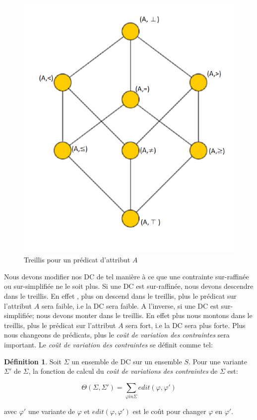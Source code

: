 \documentclass[letterpaper, 12pt]{report}
\theoremstyle{definition}
\newtheorem{mydef}{Définition}
\begin{document}
\begin{figure}
	\centering
	\includegraphics[scale=0.5]{img/treillis}
	\caption{\label{treillis} Treillis pour un prédicat d'attribut $A$}
\end{figure}

Nous devons modifier nos DC de tel manière à ce que une contrainte sur-raffinée ou sur-simplifiée ne le soit plus. Si une DC est sur-raffinée, nous devons descendre dans le treillis. En effet , plus on descend dans le treillis, plus le prédicat sur l'attribut $A$ sera faible, i.e la DC sera faible. A l'inverse, si une DC est sur-simplifiée; nous devons monter dans le treillis. En effet plus nous montons dans le treillis, plus le prédicat sur l'attribut $A$ sera fort, i.e la DC sera plus forte. Plus nous changeons de prédicats, plus le \emph{coût de variation des contraintes} sera important. Le \emph{coût de variation des contraintes} se définit comme tel: 

\begin{mydef}
Soit $\Sigma$ un ensemble de DC sur un ensemble $S$. Pour une variante $\Sigma '$ de $\Sigma$, la fonction de calcul du \emph{coût de variations des contraintes} de $\Sigma$ est:

$$\Theta (\Sigma,\Sigma ') = \sum_{\varphi in \Sigma} edit(\varphi,\varphi ')$$

\hspace*{2cm} avec $\varphi '$ une variante de $\varphi$ et $edit(\varphi,\varphi ')$ est le coût pour changer $\varphi$ en $\varphi'$.
\end{mydef}
\end{document}
